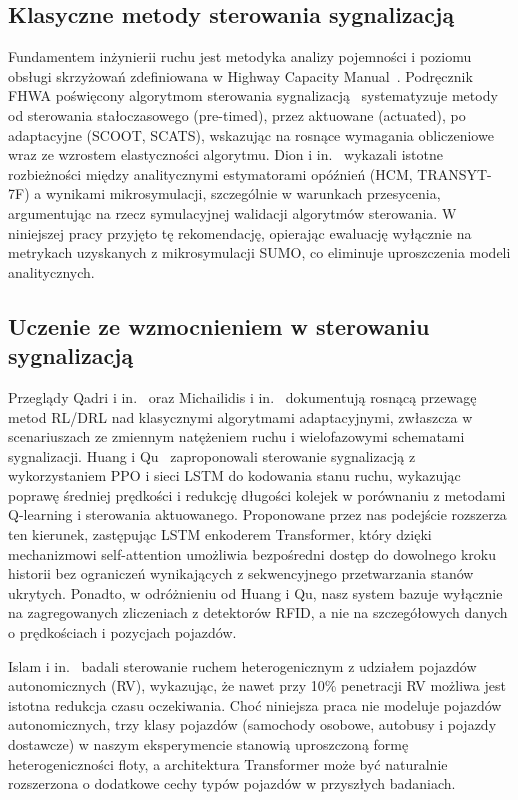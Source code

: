 \documentclass[10pt,a4paper]{article}
\begin{document}
\subsection{Klasyczne metody sterowania sygnalizacją}

Fundamentem inżynierii ruchu jest metodyka analizy pojemności i poziomu obsługi skrzyżowań zdefiniowana w Highway Capacity Manual~\cite{ref12}. Podręcznik FHWA poświęcony algorytmom sterowania sygnalizacją~\cite{ref9} systematyzuje metody od sterowania stałoczasowego (pre-timed), przez aktuowane (actuated), po adaptacyjne (SCOOT, SCATS), wskazując na rosnące wymagania obliczeniowe wraz ze wzrostem elastyczności algorytmu. Dion i in.~\cite{ref13} wykazali istotne rozbieżności między analitycznymi estymatorami opóźnień (HCM, TRANSYT-7F) a wynikami mikrosymulacji, szczególnie w warunkach przesycenia, argumentując na rzecz symulacyjnej walidacji algorytmów sterowania. W niniejszej pracy przyjęto tę rekomendację, opierając ewaluację wyłącznie na metrykach uzyskanych z mikrosymulacji SUMO, co eliminuje uproszczenia modeli analitycznych.

\subsection{Uczenie ze wzmocnieniem w sterowaniu sygnalizacją}

Przeglądy Qadri i in.~\cite{ref1} oraz Michailidis i in.~\cite{ref2} dokumentują rosnącą przewagę metod RL/DRL nad klasycznymi algorytmami adaptacyjnymi, zwłaszcza w scenariuszach ze zmiennym natężeniem ruchu i wielofazowymi schematami sygnalizacji. Huang i Qu~\cite{ref14} zaproponowali sterowanie sygnalizacją z wykorzystaniem PPO i sieci LSTM do kodowania stanu ruchu, wykazując poprawę średniej prędkości i redukcję długości kolejek w porównaniu z metodami Q-learning i sterowania aktuowanego. Proponowane przez nas podejście rozszerza ten kierunek, zastępując LSTM enkoderem Transformer, który dzięki mechanizmowi self-attention umożliwia bezpośredni dostęp do dowolnego kroku historii bez ograniczeń wynikających z sekwencyjnego przetwarzania stanów ukrytych. Ponadto, w odróżnieniu od Huang i Qu, nasz system bazuje wyłącznie na zagregowanych zliczeniach z detektorów RFID, a nie na szczegółowych danych o prędkościach i pozycjach pojazdów.

Islam i in.~\cite{ref11} badali sterowanie ruchem heterogenicznym z udziałem pojazdów autonomicznych (RV), wykazując, że nawet przy 10\% penetracji RV możliwa jest istotna redukcja czasu oczekiwania. Choć niniejsza praca nie modeluje pojazdów autonomicznych, trzy klasy pojazdów (samochody osobowe, autobusy i pojazdy dostawcze) w naszym eksperymencie stanowią uproszczoną formę heterogeniczności floty, a architektura Transformer może być naturalnie rozszerzona o dodatkowe cechy typów pojazdów w przyszłych badaniach.
\end{document}

